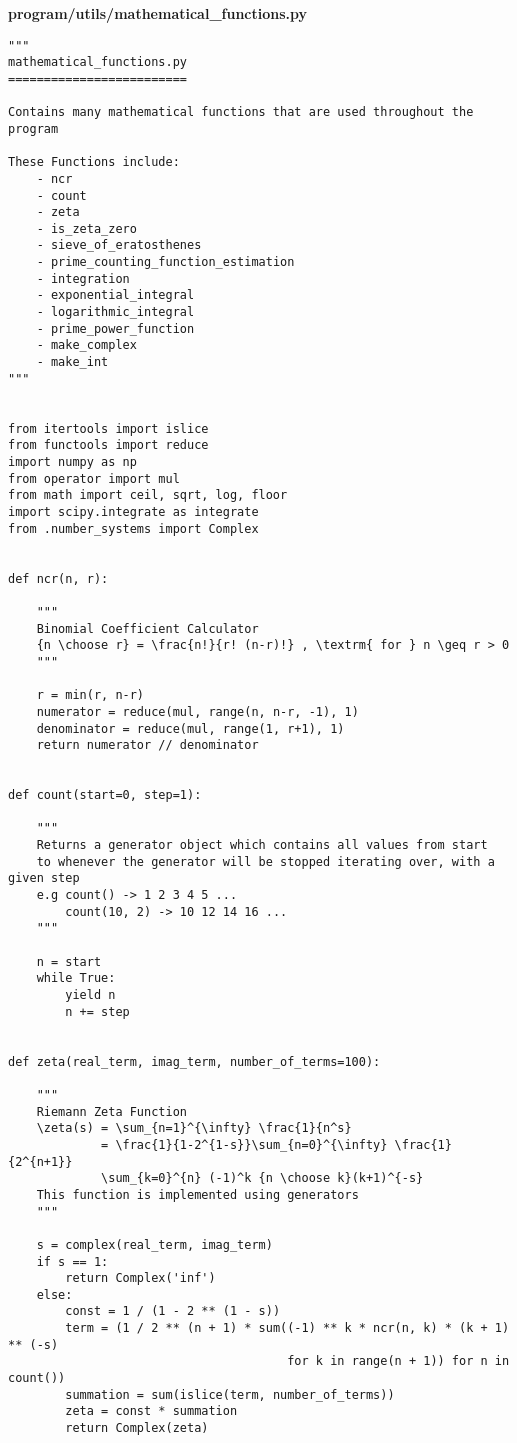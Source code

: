 \documentclass{article}
\begin{document}
\textbf{program/utils/mathematical\_functions.py}

\begin{lstlisting}
"""
mathematical_functions.py
=========================

Contains many mathematical functions that are used throughout the program

These Functions include:
    - ncr
    - count
    - zeta
    - is_zeta_zero
    - sieve_of_eratosthenes
    - prime_counting_function_estimation
    - integration
    - exponential_integral
    - logarithmic_integral
    - prime_power_function
    - make_complex
    - make_int
"""


from itertools import islice
from functools import reduce
import numpy as np
from operator import mul
from math import ceil, sqrt, log, floor
import scipy.integrate as integrate
from .number_systems import Complex


def ncr(n, r):

    """
    Binomial Coefficient Calculator
    {n \choose r} = \frac{n!}{r! (n-r)!} , \textrm{ for } n \geq r > 0
    """

    r = min(r, n-r)
    numerator = reduce(mul, range(n, n-r, -1), 1)
    denominator = reduce(mul, range(1, r+1), 1)
    return numerator // denominator


def count(start=0, step=1):

    """
    Returns a generator object which contains all values from start
    to whenever the generator will be stopped iterating over, with a given step
    e.g count() -> 1 2 3 4 5 ...
        count(10, 2) -> 10 12 14 16 ...
    """

    n = start
    while True:
        yield n
        n += step


def zeta(real_term, imag_term, number_of_terms=100):

    """
    Riemann Zeta Function
    \zeta(s) = \sum_{n=1}^{\infty} \frac{1}{n^s}
             = \frac{1}{1-2^{1-s}}\sum_{n=0}^{\infty} \frac{1}{2^{n+1}}
             \sum_{k=0}^{n} (-1)^k {n \choose k}(k+1)^{-s}
    This function is implemented using generators
    """

    s = complex(real_term, imag_term)
    if s == 1:
        return Complex('inf')
    else:
        const = 1 / (1 - 2 ** (1 - s))
        term = (1 / 2 ** (n + 1) * sum((-1) ** k * ncr(n, k) * (k + 1) ** (-s)
                                       for k in range(n + 1)) for n in count())
        summation = sum(islice(term, number_of_terms))
        zeta = const * summation
        return Complex(zeta)



\end{lstlisting}
\end{document}
